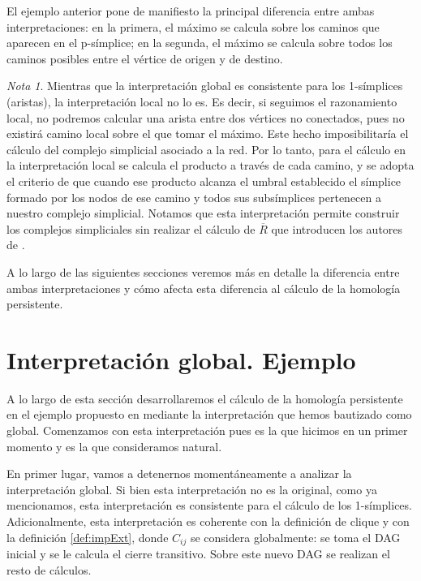 \documentclass[12pt, a4paper, twoside]{book}
\numberwithin{equation}{section}
\theoremstyle{definition}
\theoremstyle{remark}
\newtheorem*{remark}{Nota}
\theoremstyle{plain}
\begin{document}
	El ejemplo anterior pone de manifiesto la principal diferencia 
	entre ambas interpretaciones: en la primera, el máximo se 
	calcula sobre los caminos que aparecen en el p-símplice; en la 
	segunda, el máximo se calcula sobre todos los caminos posibles entre el 
	vértice de origen y de destino. 
	\begin{remark}
		Mientras que la interpretación global es consistente 
		para los 1-símplices (aristas), la interpretación 
		local no lo es. Es decir, si seguimos el razonamiento local, 
		no podremos calcular una arista entre dos vértices no 
		conectados, pues no existirá camino local sobre el que tomar 
		el máximo. Este hecho imposibilitaría el cálculo del complejo 
		simplicial asociado a la red. Por lo tanto, para el cálculo en 
		la interpretación local se calcula el producto a través de cada 
		camino, y se adopta el criterio de que cuando ese producto alcanza 
		el umbral establecido el símplice formado por los nodos de ese 
		camino y todos sus subsímplices pertenecen a nuestro complejo 
		simplicial. Notamos que esta interpretación permite construir 
		los complejos simpliciales sin realizar el cálculo de 
		$\overline{R}$ que introducen los autores de 
		\cite{Articulo-Watanabe}.	
	\end{remark}
	
	A lo largo de las siguientes secciones veremos más en detalle la 
	diferencia entre ambas interpretaciones y cómo afecta esta diferencia
	al cálculo de la homología persistente.

	\section{Interpretación global. Ejemplo}
	
	A lo largo de esta sección desarrollaremos el cálculo de la homología
	persistente en el ejemplo propuesto en \cite{Articulo-Watanabe} 
	mediante la interpretación que hemos bautizado como global. Comenzamos
	con esta interpretación pues es la que hicimos en un primer momento y 
	es la que consideramos natural.

	En primer lugar, vamos a detenernos momentáneamente a analizar la 
	interpretación global. Si bien esta interpretación no es la original, 
	como ya mencionamos, esta interpretación es consistente para el 
	cálculo de los 1-símplices. Adicionalmente, esta interpretación es 
	coherente con la definición de clique y con la definición 
	\ref{def:impExt}, donde $C_{ij}$ se considera globalmente: se toma el 
	DAG
	inicial y se le calcula el cierre transitivo. Sobre este nuevo DAG se
	realizan el resto de cálculos.
\end{document}
